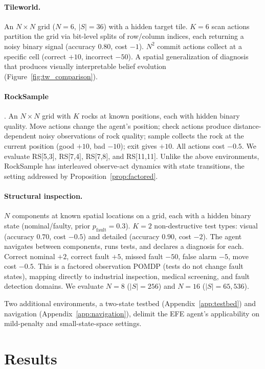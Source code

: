 \documentclass[runningheads]{llncs}
\begin{document}
\paragraph{Tileworld.} An $N{\times}N$ grid ($N{=}6$, $|S|{=}36$) with a hidden target tile. $K{=}6$ scan actions partition the grid via bit-level splits of row/column indices, each returning a noisy binary signal (accuracy $0.80$, cost $-1$). $N^2$ commit actions collect at a specific cell (correct $+10$, incorrect $-50$). A spatial generalization of diagnosis that produces visually interpretable belief evolution (Figure~\ref{fig:tw_comparison}).

\paragraph{RockSample} \citep{smith2004}. An $N{\times}N$ grid with $K$ rocks at known positions, each with hidden binary quality. Move actions change the agent's position; check actions produce distance-dependent noisy observations of rock quality; sample collects the rock at the current position (good $+10$, bad $-10$); exit gives $+10$. All actions cost $-0.5$. We evaluate RS[5,3], RS[7,4], RS[7,8], and RS[11,11]. Unlike the above environments, RockSample has interleaved observe-act dynamics with state transitions, the setting addressed by Proposition~\ref{prop:factored}.

\paragraph{Structural inspection.} $N$ components at known spatial locations on a grid, each with a hidden binary state (nominal/faulty, prior $p_{\text{fault}}{=}0.3$). $K{=}2$ non-destructive test types: visual (accuracy $0.70$, cost $-0.5$) and detailed (accuracy $0.90$, cost $-2$). The agent navigates between components, runs tests, and declares a diagnosis for each. Correct nominal $+2$, correct fault $+5$, missed fault $-50$, false alarm $-5$, move cost $-0.5$. This is a factored observation POMDP (tests do not change fault states), mapping directly to industrial inspection, medical screening, and fault detection domains. We evaluate $N{=}8$ ($|S|{=}256$) and $N{=}16$ ($|S|{=}65{,}536$).

Two additional environments, a two-state testbed (Appendix~\ref{app:testbed}) and navigation (Appendix~\ref{app:navigation}), delimit the EFE agent's applicability on mild-penalty and small-state-space settings.

\section{Results}
\end{document}
